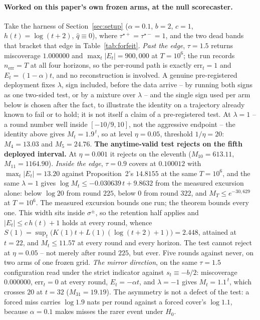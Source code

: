 \paragraph{Worked on this paper's own frozen arms, at the null scorecaster.} Take the harness of
Section~\ref{sec:setup} ($\alpha = 0.1$, $b = 2$, $c = 1$, $h(t) = \log(t+2)$, $\hat{q} \equiv 0$),
where $\tau^{\star+} = \tau^{\star-} = 1$, and the two dead bands that bracket that edge in
Table~\ref{tab:forfeit}. \emph{Past the edge}, $\tau = 1.5$ returns
miscoverage $1.000000$ and $\max_t|E_t| = 900{,}000$ at $T = 10^6$; the run records
$n_{\mathrm{err}} = T$ at all four horizons, so the per-round path is exactly $\mathrm{err}_t = 1$
and $E_t = (1-\alpha)t$, and no reconstruction is involved. A genuine pre-registered deployment
fixes $\lambda$, sign included, before the data arrive -- by running both signs as one two-sided
test, or by a mixture over $\lambda$ -- and the single sign used per arm below is chosen after the
fact, to illustrate the identity on a trajectory already known to fail or to hold; it is not itself
a claim of a pre-registered test. At $\lambda = 1$ -- a round number well
inside $[-10/9,10]$, not the aggressive endpoint -- the identity above gives $M_t = 1.9^{\,t}$, so
at level $\eta = 0.05$, threshold $1/\eta = 20$: $M_4 = 13.03$ and $M_5 = 24.76$. \textbf{The
anytime-valid test rejects on the fifth deployed interval.} At $\eta = 0.001$ it rejects on the
eleventh ($M_{10} = 613.11$, $M_{11} = 1164.90$). \emph{Inside the edge}, $\tau = 0.9$ covers at
$0.100012$ with $\max_t|E_t| = 13.20$ against Proposition~2's $14.8155$ at the same $T = 10^6$, and
the same $\lambda = 1$ gives $\log M_t \le -0.030639\,t + 9.8632$ from the measured excursion
alone: below $\log 20$ from round $225$, below $0$ from round $322$, and $M_T \le e^{-30{,}629}$ at
$T = 10^6$. The measured excursion bounds one run; the theorem bounds every one. This width sits
inside $\sigma^{\pm}$, so the retention half applies and $|E_t| \le c\,h(t)+1$ holds at every
round, whence $S(1) = \sup_t\big(K(1)t + L(1)(\log(t+2)+1)\big) = 2.448$, attained at $t = 22$, and
$M_t \le 11.57$ at every round and every horizon. The test cannot reject at $\eta = 0.05$ -- not
merely after round $225$, but ever. Five rounds against never, on two arms of one frozen grid.
\emph{The mirror direction}, on the same $\tau = 1.5$ configuration read under the strict indicator
against $s_t \equiv -b/2$: miscoverage $0.000000$, $\mathrm{err}_t = 0$ at every round, $E_t =
-\alpha t$, and $\lambda = -1$ gives $M_t = 1.1^{\,t}$, which crosses $20$ at $t = 32$ ($M_{31} =
19.19$). The asymmetry is not a defect of the test: a forced miss carries $\log 1.9$ nats per round
against a forced cover's $\log 1.1$, because $\alpha = 0.1$ makes misses the rarer event under
$H_0$.

